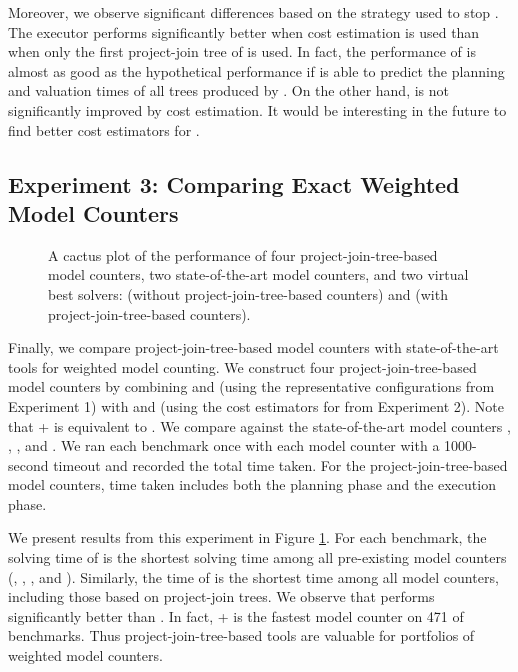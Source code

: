 Moreover, we observe significant differences based on the strategy used to stop \Lg{}.
The executor \Tensor{} performs significantly better when cost estimation is used than when only the first project-join tree of \Lg{} is used.
In fact, the performance of \Tensor{} is almost as good as the hypothetical performance if \Tensor{} is able to predict the planning and valuation times of all trees produced by \Lg{}.
On the other hand, \Dmc{} is not significantly improved by cost estimation.
It would be interesting in the future to find better cost estimators for \Dmc{}.


\subsection{Experiment 3: Comparing Exact Weighted Model Counters}
\label{sec_experiments_wmc}

\begin{figure}[t]
	\centering
	
    \vspace*{-1cm}
	\caption{\label{fig:comparison} A cactus plot of the performance of four project-join-tree-based model counters, two state-of-the-art model counters, and two virtual best solvers:  (without project-join-tree-based counters) and  (with project-join-tree-based counters).}
\end{figure}

Finally, we compare project-join-tree-based model counters with state-of-the-art tools for weighted model counting.
We construct four project-join-tree-based model counters by combining \Htb{} and \Lg{} (using the representative configurations from Experiment 1) with \Dmc{} and \Tensor{} (using the cost estimators for \Lg{} from Experiment 2).
Note that \Dmc{}+\Htb{} is equivalent to  \cite{DPV20}.
We compare against the state-of-the-art model counters \cachet{} \cite{sang2004combining}, \ctd{} \cite{darwiche2004new}, \df{} \cite{LM17}, and \minictd{} \cite{OD15}.
We ran each benchmark once with each model counter with a 1000-second timeout and recorded the total time taken.
For the project-join-tree-based model counters, time taken includes both the planning phase and the execution phase.

We present results from this experiment in Figure \ref{fig:comparison}.
For each benchmark, the solving time of  is the shortest solving time among all pre-existing model counters (\cachet, \ctd, \df, and \minictd).
Similarly, the time of  is the shortest time among all model counters, including those based on project-join trees.
We observe that  performs significantly better than .
In fact, \Dmc{}+\Lg{} is the fastest model counter on 471 of \benchmarkCountAltogether{} benchmarks.
Thus project-join-tree-based tools are valuable for portfolios of weighted model counters.
